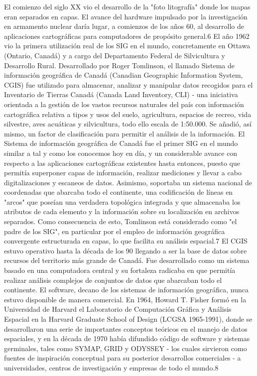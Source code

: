 El comienzo del siglo XX vio el desarrollo de la "foto litografía" donde los mapas eran separados en capas. El avance del hardware impulsado por la investigación en armamento nuclear daría lugar, a comienzos de los años 60, al desarrollo de aplicaciones cartográficas para computadores de propósito general.6
El año 1962 vio la primera utilización real de los SIG en el mundo, concretamente en Ottawa (Ontario, Canadá) y a cargo del Departamento Federal de Silvicultura y Desarrollo Rural. Desarrollado por Roger Tomlinson, el llamado Sistema de información geográfica de Canadá (Canadian Geographic Information System, CGIS) fue utilizado para almacenar, analizar y manipular datos recogidos para el Inventario de Tierras Canadá (Canada Land Inventory, CLI) - una iniciativa orientada a la gestión de los vastos recursos naturales del país con información cartográfica relativa a tipos y usos del suelo, agricultura, espacios de recreo, vida silvestre, aves acuáticas y silvicultura, todo ello escala de 1:50.000. Se añadió, así mismo, un factor de clasificación para permitir el análisis de la información.
El Sistema de información geográfica de Canadá fue el primer SIG en el mundo similar a tal y como los conocemos hoy en día, y un considerable avance con respecto a las aplicaciones cartográficas existentes hasta entonces, puesto que permitía superponer capas de información, realizar mediciones y llevar a cabo digitalizaciones y escaneos de datos. Asimismo, soportaba un sistema nacional de coordenadas que abarcaba todo el continente, una codificación de líneas en "arcos" que poseían una verdadera topológica integrada y que almacenaba los atributos de cada elemento y la información sobre su localización en archivos separados. Como consecuencia de esto, Tomlinson está considerado como "el padre de los SIG", en particular por el empleo de información geográfica convergente estructurada en capas, lo que facilita su análisis espacial.7 El CGIS estuvo operativo hasta la década de los 90 llegando a ser la base de datos sobre recursos del territorio más grande de Canadá. Fue desarrollado como un sistema basado en una computadora central y su fortaleza radicaba en que permitía realizar análisis complejos de conjuntos de datos que abarcaban todo el continente. El software, decano de los sistemas de información geográfica, nunca estuvo disponible de manera comercial.
En 1964, Howard T. Fisher formó en la Universidad de Harvard el Laboratorio de Computación Gráfica y Análisis Espacial en la Harvard Graduate School of Design (LCGSA 1965-1991), donde se desarrollaron una serie de importantes conceptos teóricos en el manejo de datos espaciales, y en la década de 1970 había difundido código de software y sistemas germinales, tales como SYMAP, GRID y ODYSSEY - los cuales sirvieron como fuentes de inspiración conceptual para su posterior desarrollos comerciales - a universidades, centros de investigación y empresas de todo el mundo.8
